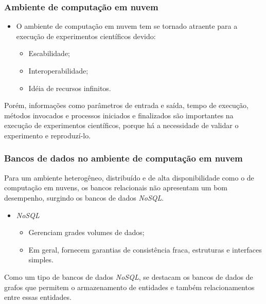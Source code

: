 \documentclass{beamer}
\begin{document}
\begin{frame}
\frametitle{Ambiente de computa\c{c}\~ao em nuvem}
\begin{itemize}
\item O ambiente de computa\c{c}\~ao em nuvem tem se tornado atraente
  para a execu\c{c}\~ao de experimentos cient\'ificos devido:
\begin{itemize}
\item Escabilidade;
\item Interoperabilidade;
\item Id\'eia de recursos infinitos.
\end{itemize}
\end{itemize}
\begin{block}{}
Por\'em, informa\c{c}\~oes como par\^ametros de entrada e sa\'ida, tempo de execu\c{c}\~ao,
m\'etodos invocados e processos iniciados e finalizados s\~ao
importantes na execu\c{c}\~ao de experimentos cient\'ificos, porque h\'a a necessidade de validar o experimento e reproduz\'i-lo.
\end{block}
\end{frame}

\begin{frame}
\frametitle{Bancos de dados no ambiente de computa\c{c}\~ao em
  nuvem}
\begin{block}{}
Para um ambiente heterog\^eneo, distribu\'ido e de alta disponibilidade como o de computa\c{c}\~ao em nuvens, os bancos relacionais n\~ao apresentam um bom desempenho, surgindo os bancos de dados \textit{NoSQL}.
\end{block}
\begin{itemize}
\item \textit{NoSQL}
\begin{itemize}
\item Gerenciam grades volumes de dados;
\item Em geral, fornecem garantias de consist\^encia fraca, estruturas e interfaces simples.
\end{itemize}
\end{itemize}
\begin{block}{}
Como um tipo de bancos de dados \textit{NoSQL}, se destacam os bancos de dados de grafos que permitem o armazenamento de entidades e tamb\'em relacionamentos entre essas entidades.
\end{block}
\end{frame}
\end{document}
